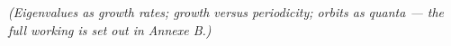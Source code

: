 \textit{(Eigenvalues as growth rates; growth versus periodicity; orbits as quanta --- the full working is set out in Annexe B.)}

% 
% 
